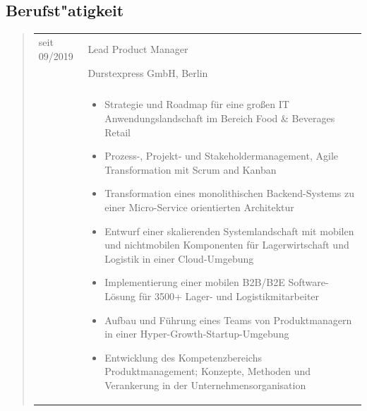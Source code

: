 \subsection*{Berufst"atigkeit}
	\begin{quote}
		\begin{tabular}{p{4cm}l}
			seit 09/2019&Lead Product Manager\\
            &Durstexpress GmbH, Berlin\\
			\\
			&\begin{minipage}{10cm}
                \begin{itemize}
                    \item Strategie und Roadmap für eine großen IT Anwendungslandschaft im Bereich Food \& Beverages Retail
                    \item Prozess-, Projekt- und Stakeholdermanagement, Agile Transformation mit Scrum and Kanban
                    \item Transformation eines monolithischen Backend-Systems zu einer Micro-Service orientierten Architektur
                    \item Entwurf einer skalierenden Systemlandschaft mit mobilen und nichtmobilen Komponenten für 
                          Lagerwirtschaft und Logistik in einer Cloud-Umgebung
                    \item Implementierung einer mobilen B2B/B2E Software-Lösung für 3500+ Lager- und Logistikmitarbeiter
                    \item Aufbau und Führung eines Teams von Produktmanagern in einer Hyper-Growth-Startup-Umgebung
                    \item Entwicklung des Kompetenzbereichs Produktmanagement; Konzepte, Methoden und Verankerung in der Unternehmensorganisation
                \end{itemize}
						

\end{minipage}
\end{tabular}
\end{quote}
